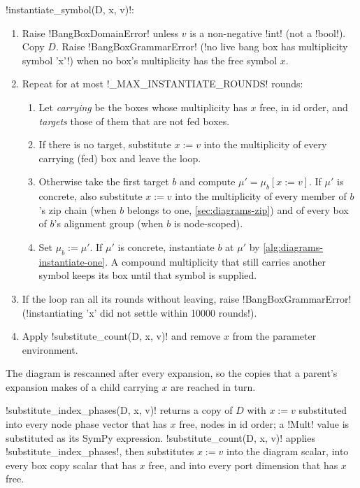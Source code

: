 \begin{algorithm}\label{alg:diagrams-instantiate-symbol}
\py!instantiate_symbol(D, x, v)!:
\begin{enumerate}
\item Raise \py!BangBoxDomainError! unless $v$ is a non-negative \py!int! (not a \py!bool!). Copy $D$. Raise \py!BangBoxGrammarError! (\code!no live bang box has multiplicity symbol 'x'!) when no box's multiplicity has the free symbol $x$.
\item Repeat for at most \py!_MAX_INSTANTIATE_ROUNDS! rounds:
\begin{enumerate}
\item Let \emph{carrying} be the boxes whose multiplicity has $x$ free, in id order, and \emph{targets} those of them that are not fed boxes.
\item If there is no target, substitute $x:=v$ into the multiplicity of every carrying (fed) box and leave the loop.
\item Otherwise take the first target $b$ and compute $\mu'=\mu_b[x:=v]$. If $\mu'$ is concrete, also substitute $x:=v$ into the multiplicity of every member of $b$'s zip chain (when $b$ belongs to one, \cref{sec:diagrams-zip}) and of every box of $b$'s alignment group (when $b$ is node-scoped).
\item Set $\mu_b:=\mu'$. If $\mu'$ is concrete, instantiate $b$ at $\mu'$ by \cref{alg:diagrams-instantiate-one}. A compound multiplicity that still carries another symbol keeps its box until that symbol is supplied.
\end{enumerate}
\item If the loop ran all its rounds without leaving, raise \py!BangBoxGrammarError! (\code!instantiating 'x' did not settle within 10000 rounds!).
\item Apply \py!substitute_count(D, x, v)! and remove $x$ from the parameter environment.
\end{enumerate}
\end{algorithm}

The diagram is rescanned after every expansion, so the copies that a parent's expansion makes of a child carrying $x$ are reached in turn.

\py!substitute_index_phases(D, x, v)! returns a copy of $D$ with $x:=v$ substituted into every node phase vector that has $x$ free, nodes in id order; a \py!Mult! value is substituted as its SymPy expression. \py!substitute_count(D, x, v)! applies \py!substitute_index_phases!, then substitutes $x:=v$ into the diagram scalar, into every box copy scalar that has $x$ free, and into every port dimension that has $x$ free.

